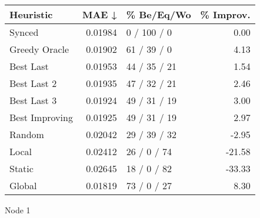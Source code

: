 \begin{tabular}{lrlr}
\toprule
\textbf{Heuristic} & \textbf{MAE ↓} & \textbf{\% Be/Eq/Wo} & \textbf{\% Improv.} \\
\midrule
            Synced &        0.01984 &          0 / 100 / 0 &                0.00 \\
     Greedy Oracle &        0.01902 &          61 / 39 / 0 &                4.13 \\
         Best Last &        0.01953 &         44 / 35 / 21 &                1.54 \\
       Best Last 2 &        0.01935 &         47 / 32 / 21 &                2.46 \\
       Best Last 3 &        0.01924 &         49 / 31 / 19 &                3.00 \\
    Best Improving &        0.01925 &         49 / 31 / 19 &                2.97 \\
            Random &        0.02042 &         29 / 39 / 32 &               -2.95 \\
             Local &        0.02412 &          26 / 0 / 74 &              -21.58 \\
            Static &        0.02645 &          18 / 0 / 82 &              -33.33 \\
            Global &        0.01819 &          73 / 0 / 27 &                8.30 \\
\bottomrule
\end{tabular}
\caption{Node 1}
\label{tab:iid_lr05_le2_bs2_1}
